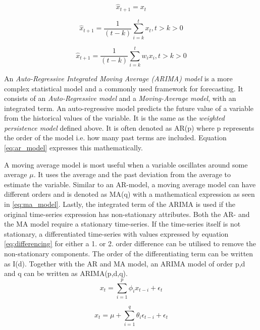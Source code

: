 \begin{equation}
    \hat{x}_{t+1} = x_{t}
    \label{eq:persistence}
\end{equation}

\begin{equation}
    \hat{x}_{t+1} = \frac{1}{(t-k)}\sum_{i=k}^{t}{x_t}     ,t>k>0
    \label{eq:persistence_avg}
\end{equation}

\begin{equation}
    \hat{x}_{t+1} = \frac{1}{(t-k)}\sum_{i=k}^{t}{w_i x_i}     ,t>k>0
    \label{eq:weighted_persistence_avg}
\end{equation}

An \textit{Auto-Regressive Integrated Moving Average (ARIMA) model} is a more complex statistical model and a commonly used framework for forecasting. It consists of an \textit{Auto-Regressive model} and a \textit{Moving-Average model}, with an integrated term. An auto-regressive model predicts the future value of a variable from the historical values of the variable. It is the same as the \textit{weighted persistence model} defined above. It is often denoted as AR(p) where p represents the order of the model i.e. how many past terms are included. Equation \ref{eq:ar_model} expresses this mathematically. 

A moving average model is most useful when a variable oscillates around some average $\mu$. It uses the average and the past deviation from the average to estimate the variable. Similar to an AR-model, a moving average model can have different orders and is denoted as MA(q) with a mathematical expression as seen in \ref{eq:ma_model}. Lastly, the integrated term of the ARIMA is used if the original time-series expression has non-stationary attributes. Both the AR- and the MA model require a stationary time-series. If the time-series itself is not stationary, a differentiated time-series with values expressed by equation \ref{eq:differencing} for either a 1. or 2. order difference can be utilised to remove the non-stationary components. The order of the differentiating term can be written as I(d). Together with the AR and MA model, an ARIMA model of order p,d and q can be written as ARIMA(p,d,q).
\begin{equation}
    x_t = \sum_{i=1}^{p}{\phi_i x_{t-i}} + \epsilon_t
    \label{eq:ar_model}
\end{equation}

\begin{equation}
    x_t = \mu + \sum_{i=1}^{q}{\theta_i \epsilon_{t-i}} + \epsilon_t
    \label{eq:ma_model}
\end{equation}

